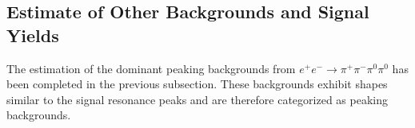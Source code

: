 



\clearpage
\subsection{Estimate of Other Backgrounds and Signal Yields}
\label{DataYields}
The estimation of the dominant peaking backgrounds from $e^{+}e^{-} \to
    \pi^{+}\pi^{-}\pi^{0}\pi^{0}$ has been completed in the previous subsection.
These backgrounds exhibit shapes similar to the signal resonance peaks and are
therefore categorized as peaking backgrounds.

